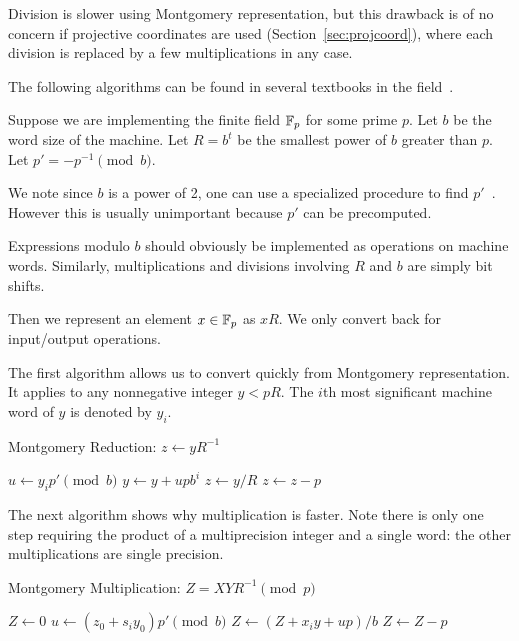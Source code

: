 Division is slower using Montgomery representation, but this drawback is
of no concern if projective coordinates are used (Section~\ref{sec:projcoord}),
where each division is replaced by a few multiplications in any case.

The following algorithms can be found in several textbooks in the
field~\cite{bss, handbook}.

Suppose we are implementing the finite field $\mathbb{F}_p$ for some prime $p$.
Let $b$ be the word size of the machine. Let $R = b^t$ be the smallest
power of $b$ greater than $p$. Let $p' = -p^{-1} \pmod b$.

We note since $b$ is a power of 2, one can use a specialized procedure
to find $p'$~\cite[Algorithm II.5]{bss}. However this is usually unimportant
because $p'$ can be precomputed.

Expressions modulo $b$ should obviously be implemented as
operations on machine words. Similarly, multiplications and divisions
involving $R$ and $b$ are simply bit shifts.

Then we represent an element $x\in\mathbb{F}_p$ as $xR$. We only convert back
for input/output operations.

The first algorithm allows us to convert quickly from Montgomery
representation. It applies to any nonnegative integer $y < pR$.
The $i$th most significant machine word of $y$ is
denoted by $y_i$.

\begin{algorithm}
\caption {Montgomery Reduction: $z \gets yR^{-1}$}
\begin{algorithmic}[1]
\STATE $u\gets y_i p' \pmod b$
\STATE $y\gets y + upb^i$
\ENDFOR
\STATE $z\gets y/R$
\STATE $z\gets z-p$
\ENDIF
\end{algorithmic}
\end{algorithm}

The next algorithm shows why multiplication is faster. Note
there is only one step requiring the product of a multiprecision integer
and a single word: the other multiplications are single precision.

\begin{algorithm}
\caption {Montgomery Multiplication: $Z = X Y R^{-1} \pmod p$}
\begin{algorithmic}[1]
\STATE $Z\gets 0$
\STATE $u\gets (z_0 + s_i y_0) p' \pmod b$
\STATE $Z\gets (Z+x_i y + u p)/b$
\ENDFOR
{}
\STATE $Z\gets Z-p$
\ENDIF
\end{algorithmic}
\end{algorithm}

